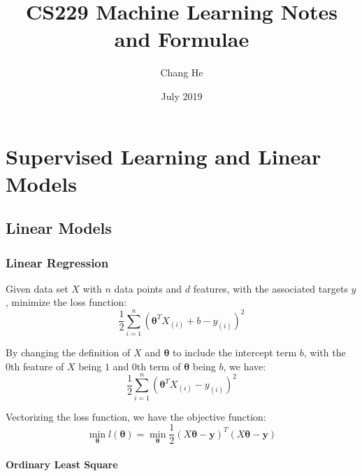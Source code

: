 \documentclass{article}
\title{CS229 Machine Learning Notes and Formulae}
\author{Chang He}
\date{July 2019}
\renewcommand{\pmb}[1]{\boldsymbol{#1}}
\begin{document}
\allowdisplaybreaks 
\maketitle

\tableofcontents
\newpage


\section{Supervised Learning and Linear Models}
\subsection{Linear Models}
\subsubsection{Linear Regression}
Given data set $X$ with $n$ data points and $d$ features, with the associated targets $y$, minimize the loss function: $$\frac{1}{2}\sum_{i=1}^n (\pmb{\theta}^T X_{(i)} + b - y_{(i)})^2$$

By changing the definition of $X$ and $\pmb\theta$ to include the intercept term $b$, with the 0th feature of $X$ being $1$ and 0th term of $\pmb\theta$ being $b$, we have:
$$\frac{1}{2}\sum_{i=1}^n (\pmb{\theta}^T X_{(i)} - y_{(i)})^2$$

Vectorizing the loss function, we have the objective function:
$$\min_{\pmb\theta} l(\pmb\theta) = \min_{\pmb\theta} \frac{1}{2} (X\pmb\theta - \pmb y)^T (X\pmb\theta - \pmb y)$$

\paragraph{Ordinary Least Square} 
\end{document}
